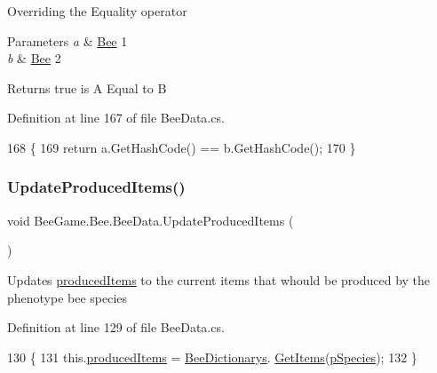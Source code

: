 Overriding the Equality operator 


\begin{DoxyParams}{Parameters}
{\em a} & \hyperlink{namespace_bee_game_1_1_bee}{Bee} 1\\
\hline
{\em b} & \hyperlink{namespace_bee_game_1_1_bee}{Bee} 2\\
\hline
\end{DoxyParams}
\begin{DoxyReturn}{Returns}
true is A Equal to B
\end{DoxyReturn}


Definition at line 167 of file Bee\+Data.\+cs.


\begin{DoxyCode}
168         \{
169             \textcolor{keywordflow}{return} a.GetHashCode() == b.GetHashCode();
170         \}
\end{DoxyCode}
\mbox{\label{struct_bee_game_1_1_bee_1_1_bee_data_ae672215675ea4965bd36669043913581}} 
\subsubsection{\texorpdfstring{Update\+Produced\+Items()}{UpdateProducedItems()}}
{\footnotesize\ttfamily void Bee\+Game.\+Bee.\+Bee\+Data.\+Update\+Produced\+Items (\begin{DoxyParamCaption}{ }\end{DoxyParamCaption})}



Updates \hyperlink{struct_bee_game_1_1_bee_1_1_bee_data_a3c49396295407e1744f501e86c32d61c}{produced\+Items} to the current items that whould be produced by the phenotype bee species 



Definition at line 129 of file Bee\+Data.\+cs.


\begin{DoxyCode}
130         \{
131             this.\hyperlink{struct_bee_game_1_1_bee_1_1_bee_data_a3c49396295407e1744f501e86c32d61c}{producedItems} = \hyperlink{class_bee_game_1_1_core_1_1_bee_dictionarys}{BeeDictionarys}.
      \hyperlink{class_bee_game_1_1_core_1_1_bee_dictionarys_a2cd137701cfdcfeb25d5e7a73397e1b4}{GetItems}(\hyperlink{struct_bee_game_1_1_bee_1_1_bee_data_a87db9add2bcc463ab444eb4ac7a4e228}{pSpecies});
132         \}
\end{DoxyCode}


